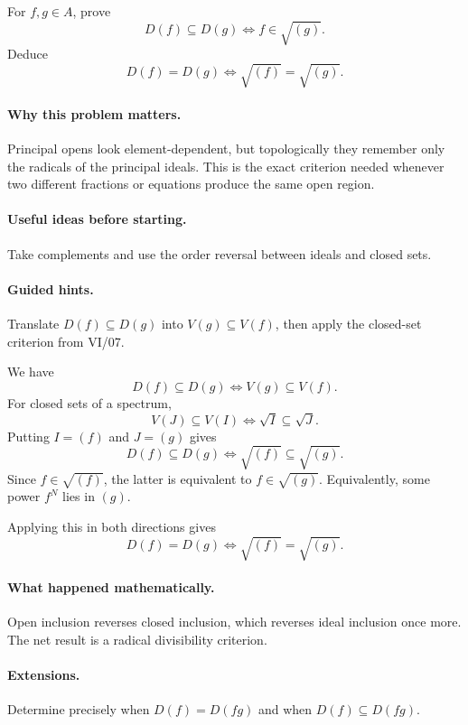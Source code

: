 \begin{problem}
For $f,g\in A$, prove
\[
D(f)\subseteq D(g)
\iff
f\in\sqrt{(g)}.
\]
Deduce
\[
D(f)=D(g)
\iff
\sqrt{(f)}=\sqrt{(g)}.
\]
\end{problem}

\paragraph{Why this problem matters.}
Principal opens look element-dependent, but topologically they remember only the radicals
of the principal ideals.  This is the exact criterion needed whenever two different
fractions or equations produce the same open region.

\paragraph{Useful ideas before starting.}
Take complements and use the order reversal between ideals and closed sets.

\paragraph{Guided hints.}
Translate $D(f)\subseteq D(g)$ into $V(g)\subseteq V(f)$, then apply the closed-set
criterion from VI/07.

\begin{solution}
We have
\[
D(f)\subseteq D(g)
\iff
V(g)\subseteq V(f).
\]
For closed sets of a spectrum,
\[
V(J)\subseteq V(I)
\iff
\sqrt I\subseteq\sqrt J.
\]
Putting $I=(f)$ and $J=(g)$ gives
\[
D(f)\subseteq D(g)
\iff
\sqrt{(f)}\subseteq\sqrt{(g)}.
\]
Since $f\in\sqrt{(f)}$, the latter is equivalent to $f\in\sqrt{(g)}$.  Equivalently,
some power $f^N$ lies in $(g)$.

Applying this in both directions gives
\[
D(f)=D(g)
\iff
\sqrt{(f)}=\sqrt{(g)}.
\]
\end{solution}

\paragraph{What happened mathematically.}
Open inclusion reverses closed inclusion, which reverses ideal inclusion once more.  The
net result is a radical divisibility criterion.

\paragraph{Extensions.}
Determine precisely when $D(f)=D(fg)$ and when $D(f)\subseteq D(fg)$.
